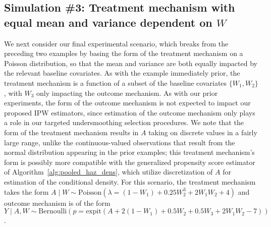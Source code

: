 \subsection{Simulation \#3: Treatment mechanism with equal mean and variance
dependent on $W$}\label{hese_sim_poisson}

We next consider our final experimental scenario, which breaks from the
preceding two examples by basing the form of the treatment mechanism on
a Poisson distribution, so that the mean and variance are both equally impacted
by the relevant baseline covariates. As with the example immediately prior, the
treatment mechanism is a function of a subset of the baseline covariates
$\{W_1, W_2\}$, with $W_3$ only impacting the outcome mechanism. As with our
prior experiments, the form of the outcome mechanism is not expected to impact
our proposed IPW estimators, since estimation of the outcome mechanism only
plays a role in our targeted undersmoothing selection procedures. We note that
the form of the treatment mechanism results in $A$ taking on discrete values in
a fairly large range, unlike the continuous-valued observations that result from
the normal distribution appearing in the prior examples; this treatment
mechanism's form is possibly more compatible with the generalized propensity
score estimator of Algorithm~\ref{alg:pooled_haz_dens}, which utilize
discretization of $A$ for estimation of the conditional density. For this
scenario, the treatment mechanism takes the form $A \mid W \sim
\text{Poisson}\left(\lambda = (1 - W_1) + 0.25 W_2^3 + 2 W_1 W_2 + 4\right)$ and
outcome mechanism is of the form $Y \mid A, W \sim \text{Bernoulli}\left(p
= \text{expit}(A + 2 (1 - W_1) + 0.5 W_2 + 0.5 W_3 + 2 W_1 W_2 - 7)\right)$.

